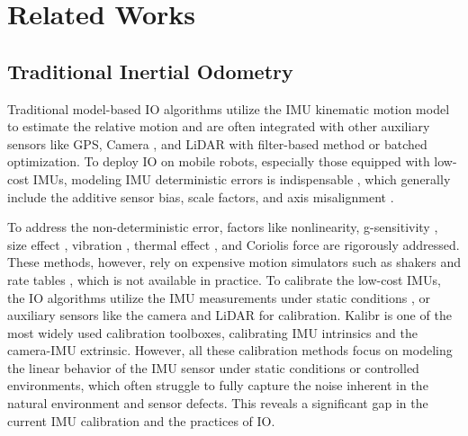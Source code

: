 \section{Related Works}

\subsection{Traditional Inertial Odometry}
\label{sec: imu-denoise}
Traditional model-based IO algorithms utilize the IMU kinematic motion model \cite{forster2015imu} to estimate the relative motion and are often integrated with other auxiliary sensors like GPS, Camera \cite{qin2018vins}, and LiDAR \cite{hemann2016long} with filter-based method or batched optimization.
To deploy IO on mobile robots, especially those equipped with low-cost IMUs, modeling IMU deterministic errors is indispensable \cite{barshan1995inertial}, which generally include the additive sensor bias, scale factors, and axis misalignment \cite{rehder2017camera}. 

To address the non-deterministic error, factors like nonlinearity, g-sensitivity \cite{Krebs2012}, size effect \cite{hung1979size}, vibration \cite{capriglione2020experimental}, thermal effect \cite{niu2013fast}, and Coriolis force \cite{brossard2021associating} are rigorously addressed.
These methods, however, rely on expensive motion simulators such as shakers and rate tables \cite{qureshi2017algorithm}, which is not available in practice.
To calibrate the low-cost IMUs, the IO algorithms utilize the IMU measurements under static conditions \cite{tedaldi2014robust, barshan1995inertial}, or auxiliary sensors like the camera \cite{rehder2016extending, yang2023online} and LiDAR \cite{lv2020targetless} for calibration.
Kalibr \cite{furgale2013unified, rehder2016extending} is one of the most widely used calibration toolboxes, calibrating IMU intrinsics and the camera-IMU extrinsic.
However, all these calibration methods focus on modeling the linear behavior of the IMU sensor under static conditions or controlled environments, which often struggle to fully capture the noise inherent in the natural environment and sensor defects.
This reveals a significant gap in the current IMU calibration and the practices of IO.

